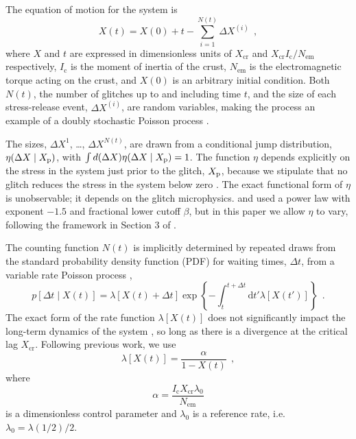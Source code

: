 The equation of motion for the system is
\begin{equation}
{X(t) = X(0) + t - \sum_{i=1}^{N(t)} \Delta X^{(i)}}\ \ ,
\label{eq:acorr_eom}
\end{equation}
where $X$ and $t$ are expressed in dimensionless units of $X_{\textrm{cr}}$ and $X_{\textrm{cr}}I_\textrm{c}/N_\textrm{em}$ respectively, $I_\textrm{c}$ is the moment of inertia of the crust, $N_\textrm{em}$ is the electromagnetic torque acting on the crust, and $X(0)$ is an arbitrary initial condition. Both $N(t)$, the number of glitches up to and including time $t$, and the size of each stress-release event, $\Delta X^{(i)}$, are random variables, making the process an example of a doubly stochastic Poisson process \citep{Cox1955, Grandell1976}.

The sizes, $\Delta X^{1}$, \dots, $\Delta X^{N(t)}$, are drawn from a conditional jump distribution, $\eta(\Delta X \mid X_{\textrm{p}})$, with $\int d(\Delta X) \eta(\Delta X \mid X_{\textrm{p}}) = 1$. The function $\eta$ depends explicitly on the stress in the system just prior to the glitch, $X_{\textrm{p}}$, because we stipulate that no glitch reduces the stress in the system below zero \citep{Fulgenzi2017}. The exact functional form of $\eta$ is unobservable; it depends on the glitch microphysics. \citet{Fulgenzi2017} and \citet{Melatos2018} used a power law with exponent $-1.5$ and fractional lower cutoff $\beta$, but in this paper we allow $\eta$ to vary, following the framework in Section 3 of \citet{Carlin2019quasi}. 

The counting function $N(t)$ is implicitly determined by repeated draws from the standard probability density function (PDF) for waiting times, $\Delta t$, from a variable rate Poisson process \citep{Cox1955},
\begin{equation}
\label{eq:acorr_delt}
{p[\Delta t \mid X(t)] = \lambda\left[ X(t) + \Delta t\right] \exp\left\{ -\int_{t}^{t+\Delta t} \text{d} t' \lambda [X(t')] \right\}}\ \ .
\end{equation}
The exact form of the rate function $\lambda[X(t)]$ does not significantly impact the long-term dynamics of the system \citep{Fulgenzi2017, Carlin2019quasi}, so long as there is a divergence at the critical lag $X_\textrm{cr}$. Following previous work, we use
\begin{equation}
\label{eq:acorr_rate}
{\lambda[X(t)] = \frac{\alpha}{1 - X(t)}}\ \ ,
\end{equation}
where
\begin{equation}
{\alpha = \frac{I_\textrm{c} X_\textrm{cr} \lambda_0}{N_\textrm{em}}}
\end{equation}
is a dimensionless control parameter and $\lambda_0$ is a reference rate, i.e. $\lambda_0 = \lambda(1/2)/2$. 

